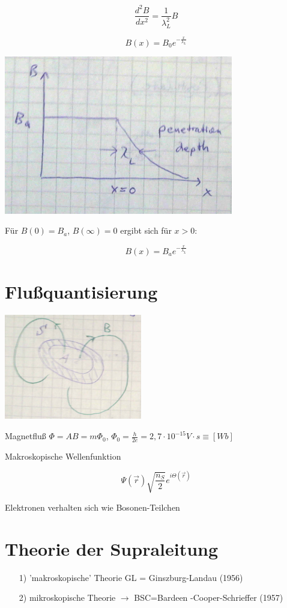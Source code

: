 \[\frac{d^2 B}{dx^2} = \frac{1}{\lambda^2_L}B\]


\[B(x) = B_0e^{-\frac{x}{\lambda_L}}\]


\includegraphics[width=0.75\textwidth]{kap13_08.png}


Für \(B(0) = B_a\), \(B(\infty) = 0\) ergibt sich für \(x>0\):

\[B(x) = B_a e^{-\frac{x}{\lambda_L}}\]


\section{Flußquantisierung}

\includegraphics[width=0.45\textwidth]{kap13_09.png}


Magnetfluß \(\Phi = AB = m\Phi_0\), \(\Phi_0 = \frac{h}{2e}=2,7\cdot 10^{-15}V\cdot s\equiv [Wb] \)


Makroskopische Wellenfunktion

\[\Psi(\vec r) \sqrt{\frac{n_S}{2}} e^{i\Theta(\vec r)}\]

Elektronen verhalten sich wie Bosonen-Teilchen


\section{Theorie der Supraleitung}

\begin{enumerate}
\item[1)] 'makroskopische' Theorie GL = Ginszburg-Landau (1956)
\item[2)] mikroskopische Theorie \(\rightarrow \) BSC=Bardeen -Cooper-Schrieffer (1957)
\end{enumerate}

